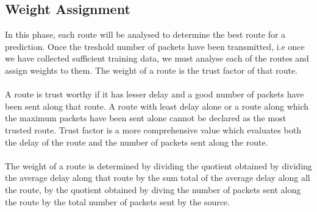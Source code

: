 \documentclass[journal]{IEEEtran}
\begin{document}
\subsection{Weight Assignment}
In this phase, each route will be analysed to determine the best route for a prediction. Once the treshold number of packets have been transmitted, i.e once we have collected sufficient training data, we must analyse each of the routes and assign weights to them. The weight of a route is the trust factor of that route.\\ \\
\indent A route is trust worthy if it has lesser delay and a good number of packets have been sent along that route. A route with least delay alone or a route along which the maximum packets have been sent alone cannot be declared as the most trusted route. Trust factor is a more comprehensive value which evaluates both the delay of the route and the number of packets sent along the route.\\ \\
\indent The weight of a route is determined by dividing the quotient obtained by dividing the average delay along that route by the sum total of the average delay along all the route, by the quotient obtained by diving the number of packets sent along the route by the total number of packets sent by the source.\\ \\  
\end{document}
